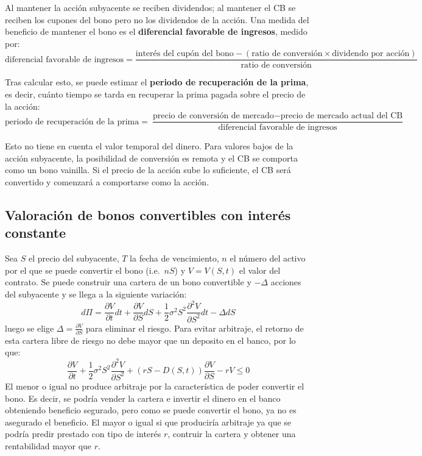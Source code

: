 Al mantener la acción subyacente se reciben dividendos; al mantener el CB se reciben los cupones del bono pero no los dividendos de la acción. Una medida del beneficio de mantener el bono es el \textbf{diferencial favorable de ingresos}, medido por:
\begin{equation*}
    \text{diferencial favorable de ingresos} = \frac{\text{interés del cupón del bono} - (\text{ratio de conversión} \times \text{dividendo por acción})}{\text{ratio de conversión}}
\end{equation*}

Tras calcular esto, se puede estimar el \textbf{periodo de recuperación de la prima}, es decir, cuánto tiempo se tarda en recuperar la prima pagada sobre el precio de la acción:
\begin{equation*}
    \text{periodo de recuperación de la prima} = \frac{\text{precio de conversión de mercado} - \text{precio de mercado actual del CB}}{\text{diferencial favorable de ingresos}}
\end{equation*}

Esto no tiene en cuenta el valor temporal del dinero. Para valores bajos de la acción subyacente, la posibilidad de conversión es remota y el CB se comporta como un bono vainilla. Si el precio de la acción sube lo suficiente, el CB será convertido y comenzará a comportarse como la acción.




\subsection{Valoración de bonos convertibles con interés constante}
Sea $S$ el precio del subyacente, $T$ la fecha de vencimiento, $n$ el número del activo por el que se puede convertir el bono (i.e.\ $nS$) y $V=V(S,t)$ el valor del contrato. Se puede construir una cartera de un bono convertible y $-\Delta$ acciones del subyacente y se llega a la siguiente variación:
\begin{equation*}
    d\Pi = \frac{\partial V}{\partial t} dt + \frac{\partial V}{\partial S} dS + \frac{1}{2} \sigma^2 S^2 \frac{\partial^2 V}{\partial S^2} dt - \Delta dS
\end{equation*}
luego se elige $\Delta = \frac{\partial V}{\partial S}$ para eliminar el riesgo. Para evitar arbitraje, el retorno de esta cartera libre de riesgo no debe mayor que un deposito en el banco, por lo que:
\begin{equation*}
    \boxed{\frac{\partial V}{\partial t} + \frac{1}{2} \sigma^2 S^2 \frac{\partial^2 V}{\partial S^2} + \left(rS - D(S,t)\right) \frac{\partial V}{\partial S} - rV \leq 0}
\end{equation*}
El menor o igual no produce arbitraje por la característica de poder convertir el bono. Es decir, se podría vender la cartera e invertir el dinero en el banco obteniendo beneficio segurado, pero como se puede convertir el bono, ya no es asegurado el beneficio. El mayor o igual si que produciría arbitraje ya que se podría predir prestado con tipo de interés $r$, contruir la cartera y obtener una rentabilidad mayor que $r$.

